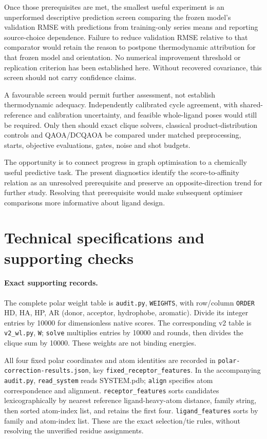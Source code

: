 \documentclass{article}
\begin{document}
Once those prerequisites are met, the smallest useful experiment is an unperformed descriptive prediction screen comparing the frozen model's validation RMSE with predictions from training-only series means and reporting source-choice dependence. Failure to reduce validation RMSE relative to that comparator would retain the reason to postpone thermodynamic attribution for that frozen model and orientation. No numerical improvement threshold or replication criterion has been established here. Without recovered covariance, this screen should not carry confidence claims.

A favourable screen would permit further assessment, not establish thermodynamic adequacy. Independently calibrated cycle agreement, with shared-reference and calibration uncertainty, and feasible whole-ligand poses would still be required. Only then should exact clique solvers, classical product-distribution controls and QAOA/DCQAOA be compared under matched preprocessing, starts, objective evaluations, gates, noise and shot budgets.

The opportunity is to connect progress in graph optimisation to a chemically useful predictive task. The present diagnostics identify the score-to-affinity relation as an unresolved prerequisite and preserve an opposite-direction trend for further study. Resolving that prerequisite would make subsequent optimiser comparisons more informative about ligand design.

\appendix
\section{Technical specifications and supporting checks}

\paragraph{Exact supporting records.}
The complete polar weight table is \texttt{audit.py}, \texttt{WEIGHTS}, with row/column \texttt{ORDER} HD, HA, HP, AR (donor, acceptor, hydrophobe, aromatic). Divide its integer entries by 10000 for dimensionless native scores. The corresponding v2 table is \texttt{v2\_wl.py}, \texttt{W}; \texttt{solve} multiplies entries by 10000 and rounds, then divides the clique sum by 10000. These weights are not binding energies.

All four fixed polar coordinates and atom identities are recorded in \texttt{polar-correction-results.json}, key \texttt{fixed\_receptor\_features}. In the accompanying \texttt{audit.py}, \texttt{read\_system} reads SYSTEM.pdb; \texttt{align} specifies atom correspondence and alignment. \texttt{receptor\_features} sorts candidates lexicographically by nearest reference ligand-heavy-atom distance, family string, then sorted atom-index list, and retains the first four. \texttt{ligand\_features} sorts by family and atom-index list. These are the exact selection/tie rules, without resolving the unverified residue assignments.
\end{document}
